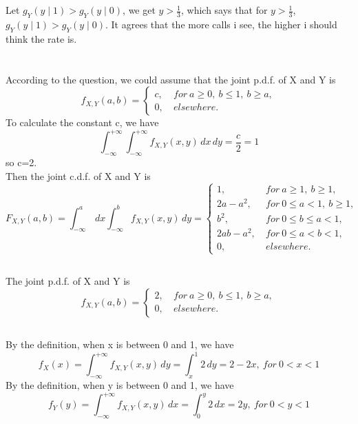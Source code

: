 \documentclass[10.5pt]{article}
\begin{document}
\subsection{}
Let $g_Y(y\mid 1) > g_Y(y\mid 0)$, we get $y > \frac{1}{3}$, which says that for $y > \frac{1}{3}$, $g_Y(y\mid 1) > g_Y(y\mid 0)$. It agrees that the more calls i see, the higher i should think the rate is.

\section{}
\subsection{}
According to the question, we could assume that the joint p.d.f. of X and Y is $$f_{X,Y}(a,b) = \begin{cases}
    c, & ~for ~a\geqslant 0,~b\leqslant 1,~b\geqslant a,\\
    0, & ~elsewhere.
\end{cases}$$ To calculate the constant c, we have $$\int_{-\infty}^{+\infty} \int_{-\infty}^{+\infty} f_{X,Y}(x,y) \,dx \,dy = \frac{c}{2} = 1$$so c=2.\\\indent
Then the joint c.d.f. of X and Y is $$F_{X,Y}(a,b) = \int_{-\infty}^a \,dx \int_{-\infty}^b f_{X,Y}(x,y) \,dy =\begin{cases}
    1, & ~for ~a\geqslant 1,~b\geqslant 1,\\
    2a-a^2, & ~for ~0\leqslant a<1,~b\geqslant 1,\\
    b^2, & ~for ~0\leqslant b\leqslant a<1,\\
    2ab-a^2, & ~for ~0\leqslant a<b<1,\\
    0, & ~elsewhere.
\end{cases}$$
\subsection{}
The joint p.d.f. of X and Y is $$f_{X,Y}(a,b) = \begin{cases}
    2, & ~for ~a\geqslant 0,~b\leqslant 1,~b\geqslant a,\\
    0, & ~elsewhere.
\end{cases}$$
\subsection{}
By the definition, when x is between 0 and 1, we have $$f_X(x) = \int_{-\infty}^{+\infty} f_{X,Y}(x,y) \,dy = \int_{x}^{1} 2 \,dy = 2-2x, ~for ~0<x<1$$\indent
By the definition, when y is between 0 and 1, we have $$f_Y(y) = \int_{-\infty}^{+\infty} f_{X,Y}(x,y) \,dx = \int_0^y 2 \,dx = 2y, ~for ~0<y<1$$
\end{document}
